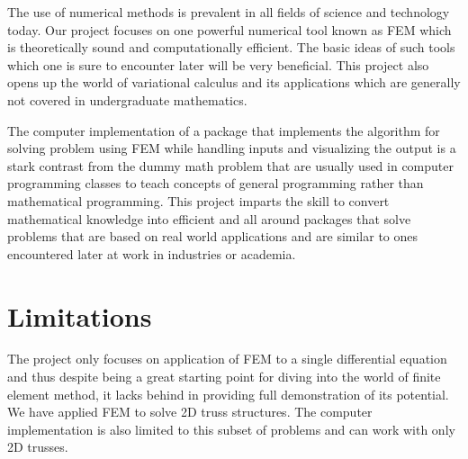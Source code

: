 The use of numerical methods is prevalent in all fields of science and technology today. Our project focuses on one powerful numerical tool known as FEM which is theoretically sound and computationally efficient. The basic ideas of such tools which one is sure to encounter later will be very beneficial. This project also opens up the world of variational calculus and its applications which are generally not covered in undergraduate mathematics.

The computer implementation of a package that implements the algorithm for solving problem using FEM while handling inputs and visualizing the output is a stark contrast from the dummy math problem that are usually used in computer programming classes to teach concepts of general programming rather than mathematical programming. This project imparts the skill to convert mathematical knowledge into efficient and all around packages that solve problems that are based on real world applications and are similar to ones encountered later at work in industries or academia.

\section{\bf Limitations}

The project only focuses on application of FEM to a single differential equation and thus despite being a great starting point for diving into the world of finite element method, it lacks behind in providing full demonstration of its potential. We have applied FEM to solve 2D truss structures. The computer implementation is also limited to this subset of problems and can work with only 2D trusses.
